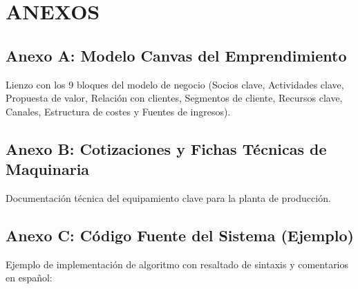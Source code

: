 \chapter*{ANEXOS}
\label{chap:anexos}

\section*{Anexo A: Modelo Canvas del Emprendimiento}
Lienzo con los 9 bloques del modelo de negocio (Socios clave, Actividades clave, Propuesta de valor, Relación con clientes, Segmentos de cliente, Recursos clave, Canales, Estructura de costes y Fuentes de ingresos).

\section*{Anexo B: Cotizaciones y Fichas Técnicas de Maquinaria}
Documentación técnica del equipamiento clave para la planta de producción.

\section*{Anexo C: Código Fuente del Sistema (Ejemplo)}
Ejemplo de implementación de algoritmo con resaltado de sintaxis y comentarios en español:


